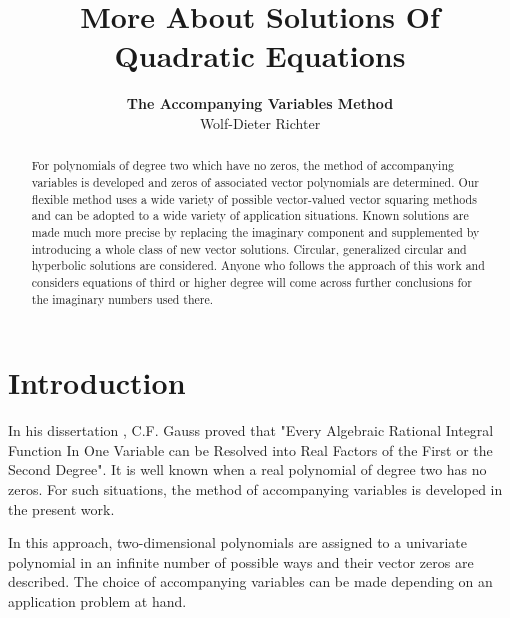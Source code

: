\documentclass{amsart}
\theoremstyle{definition}
\theoremstyle{remark}
\numberwithin{equation}{section}
\begin{document}
\title{More About Solutions Of Quadratic Equations}
\author{{\tiny\bf  The  Accompanying Variables Method}\\Wolf-Dieter Richter}%
\address{Institute of Mathematics, University of Rostock,  Germany.
\newline\hspace*{.1cm}\quad ORCID 0000/0002/3610-7219}%
%

%
%

\begin{abstract}
For polynomials of degree two which have no zeros, the method of accompanying variables is developed and zeros of associated vector polynomials are determined. Our flexible method uses a wide variety of possible vector-valued vector squaring methods and can be adopted to a wide variety of application situations. Known solutions are made much more precise by replacing the imaginary component and supplemented by introducing a whole class of new vector solutions. Circular, generalized circular and hyperbolic solutions are considered. Anyone who follows the approach of this work and considers equations of third or higher degree will come across further conclusions for the imaginary numbers used there.

\end{abstract}
\maketitle

\section{Introduction}
In his dissertation \cite{Gauss1799}, C.F. Gauss proved that "Every
Algebraic Rational Integral Function
In One Variable can be Resolved into
Real Factors of the First or the Second Degree". It is well known when a real polynomial of degree two has no zeros. For such situations, the method of accompanying variables is developed in the present work.

In this approach, two-dimensional polynomials are assigned to a univariate polynomial in an infinite number of possible ways and their vector zeros are described. The choice of accompanying variables can be made depending on an application problem at hand.
\end{document}
